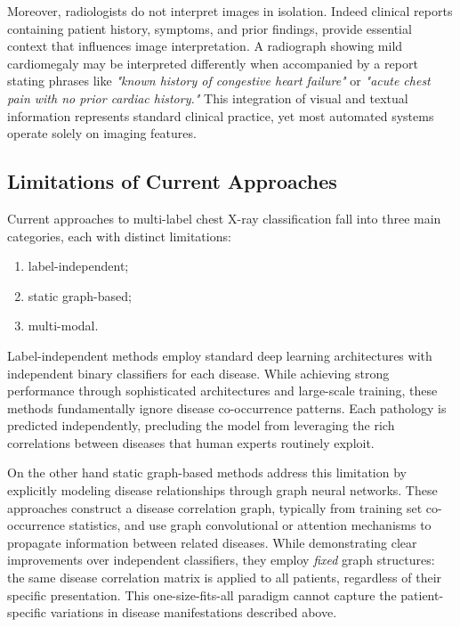\documentclass[
  journal=noname,
  manuscript=draft,
  year=,
  volume=,
]{cup-journal}
\begin{document}
Moreover, radiologists do not interpret images in isolation. Indeed clinical reports containing patient history, symptoms, and prior findings, provide essential context that influences image interpretation. A radiograph showing mild cardiomegaly may be interpreted differently when accompanied by a report stating phrases like \textit{"known history of congestive heart failure"} or \textit{"acute chest pain with no prior cardiac history."} This integration of visual and textual information represents standard clinical practice, yet most automated systems operate solely on imaging features.

\subsection{Limitations of Current Approaches}

Current approaches to multi-label chest X-ray classification fall into three main categories, each with distinct limitations:
\begin{enumerate}
    \item label-independent;
    \item static graph-based;
    \item multi-modal.
\end{enumerate}

Label-independent methods employ standard deep learning architectures with independent binary classifiers for each disease\autocite{rajpurkar2017chexnetradiologistlevelpneumoniadetection}. While achieving strong performance through sophisticated architectures and large-scale training, these methods fundamentally ignore disease co-occurrence patterns. Each pathology is predicted independently, precluding the model from leveraging the rich correlations between diseases that human experts routinely exploit.

On the other hand static graph-based methods address this limitation by explicitly modeling disease relationships through graph neural networks\autocite{bbcgn}. These approaches construct a disease correlation graph, typically from training set co-occurrence statistics, and use graph convolutional or attention mechanisms to propagate information between related diseases. While demonstrating clear improvements over independent classifiers, they employ \textit{fixed} graph structures: the same disease correlation matrix is applied to all patients, regardless of their specific presentation. This one-size-fits-all paradigm cannot capture the patient-specific variations in disease manifestations described above.
\end{document}

